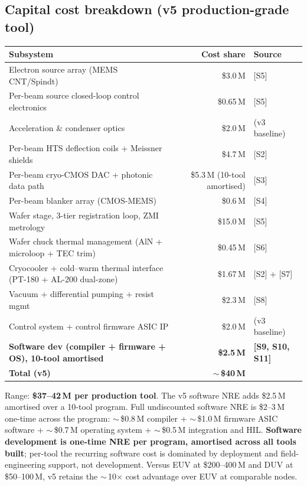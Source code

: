 \documentclass[11pt,letterpaper]{article}
\begin{document}
\subsection{Capital cost breakdown (v5 production-grade tool)}

\begin{center}
\begin{tabular}{lrl}
\toprule
Subsystem & Cost share & Source \\
\midrule
Electron source array (MEMS CNT/Spindt) & \$3.0\,M & [S5] \\
Per-beam source closed-loop control electronics & \$0.65\,M & [S5] \\
Acceleration \& condenser optics & \$2.0\,M & (v3 baseline) \\
Per-beam HTS deflection coils + Meissner shields & \$4.7\,M & [S2] \\
Per-beam cryo-CMOS DAC + photonic data path & \$5.3\,M (10-tool amortised) & [S3] \\
Per-beam blanker array (CMOS-MEMS) & \$0.6\,M & [S4] \\
Wafer stage, 3-tier registration loop, ZMI metrology & \$15.0\,M & [S5] \\
Wafer chuck thermal management (AlN + microloop + TEC trim) & \$0.45\,M & [S6] \\
Cryocooler + cold--warm thermal interface (PT-180 + AL-200 dual-zone) & \$1.67\,M & [S2] + [S7] \\
Vacuum + differential pumping + resist mgmt & \$2.3\,M & [S8] \\
Control system + control firmware ASIC IP & \$2.0\,M & (v3 baseline) \\
\textbf{Software dev (compiler + firmware + OS), 10-tool amortised} & \textbf{\$2.5\,M} & \textbf{[S9, S10, S11]} \\
\midrule
\textbf{Total (v5)} & \textbf{$\sim$\,\$40\,M} & \\
\bottomrule
\end{tabular}
\end{center}

Range: \textbf{\$37--42\,M per production tool}. The v5 software NRE adds \$2.5\,M amortised over a 10-tool program. Full undiscounted software NRE is \$2--3\,M one-time across the program: $\sim$\,\$0.8\,M compiler + $\sim$\,\$1.0\,M firmware ASIC software + $\sim$\,\$0.7\,M operating system + $\sim$\,\$0.5\,M integration and HIL. \textbf{Software development is one-time NRE per program, amortised across all tools built}; per-tool the recurring software cost is dominated by deployment and field-engineering support, not development. Versus EUV at \$200--400\,M and DUV at \$50--100\,M, v5 retains the $\sim$\,10$\times$ cost advantage over EUV at comparable nodes.
\end{document}
